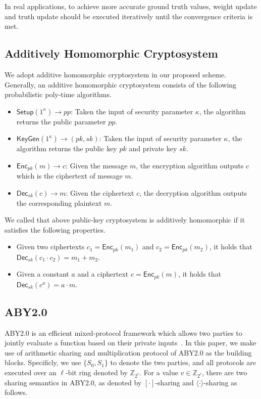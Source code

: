 \documentclass[conference]{IEEEtran}
\begin{document}
In real applications, to achieve more accurate ground truth values, weight update and truth update should be executed iteratively until the convergence criteria is met.

\subsection{Additively Homomorphic Cryptosystem}\label{sec4-b}

We adopt additive homomorphic cryptosystem in our proposed scheme.
Generally, an additive homomorphic cryptosystem consists of the following probabilistic poly-time algorithms.

\begin{itemize}
  \item $\mathsf{Setup}(1^\kappa)\to pp$: Taken the input of security parameter $\kappa$, the algorithm returns the public parameter $pp$.
  \item $\mathsf{KeyGen}(1^\kappa)\to (pk, sk)$: Taken the input of security parameter $\kappa$, the algorithm returns the public key $pk$ and private key $sk$.
  \item $\mathsf{Enc}_{pk}(m)\to c$: Given the message $m$, the encryption algorithm outputs $c$ which is the ciphertext of message $m$.
  \item $\mathsf{Dec}_{sk}(c)\to m$: Given the ciphertext $c$, the decryption algorithm outputs the corresponding plaintext $m$.
\end{itemize}

We called that above public-key cryptosystem is additively homomorphic if it satisfies the following properties.

\begin{itemize}
  \item Given two ciphertexts $c_1 = \mathsf{Enc}_{pk}(m_1)$ and $c_2 = \mathsf{Enc}_{pk}(m_2)$, it holds that $\mathsf{Dec}_{sk}(c_1 \cdot c_2) = m_1 + m_2$.
  \item Given a constant $a$ and a ciphertext $c=\mathsf{Enc}_{pk}(m)$, it holds that $\mathsf{Dec}_{sk}(c^a) = a\cdot m$.
\end{itemize}

\iffalse
\subsection{ABY2.0}

ABY2.0 is an efficient mixed-protocol framework which allows two parties to jointly evaluate a function based on their private inputs~\cite{patra_aby20_2020}.
In this paper, we make use of arithmetic sharing and multiplication protocol of ABY2.0 as the building blocks.
Specificly, we use $\{S_0, S_1\}$ to denote the two parties, and all protocols are executed over an $\ell$-bit ring denoted by $\mathbb{Z}_{2^\ell}$.
For a value $v\in\mathbb{Z}_{2^\ell}$, there are two sharing semantics in ABY2.0, as denoted by $[\cdot]$-sharing and $\langle \cdot \rangle$-sharing as follows.
\end{document}
